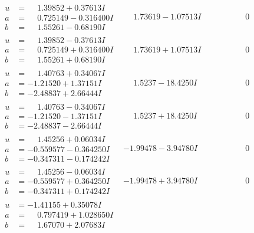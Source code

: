 \documentclass[1p]{elsarticle_modified}
\theoremstyle{definition}
\begin{document}
$$\begin{array}{c|c|c}
\begin{aligned}
u &= \phantom{-}1.39852 + 0.37613 I \\
a &= \phantom{-}0.725149 - 0.316400 I \\
b &= \phantom{-}1.55261 - 0.68190 I\end{aligned}
 & \phantom{-}1.73619 - 1.07513 I & \phantom{-0.000000 } 0 \\ \hline\begin{aligned}
u &= \phantom{-}1.39852 - 0.37613 I \\
a &= \phantom{-}0.725149 + 0.316400 I \\
b &= \phantom{-}1.55261 + 0.68190 I\end{aligned}
 & \phantom{-}1.73619 + 1.07513 I & \phantom{-0.000000 } 0 \\ \hline\begin{aligned}
u &= \phantom{-}1.40763 + 0.34067 I \\
a &= -1.21520 + 1.37151 I \\
b &= -2.48837 + 2.66444 I\end{aligned}
 & \phantom{-}1.5237 - 18.4250 I & \phantom{-0.000000 } 0 \\ \hline\begin{aligned}
u &= \phantom{-}1.40763 - 0.34067 I \\
a &= -1.21520 - 1.37151 I \\
b &= -2.48837 - 2.66444 I\end{aligned}
 & \phantom{-}1.5237 + 18.4250 I & \phantom{-0.000000 } 0 \\ \hline\begin{aligned}
u &= \phantom{-}1.45256 + 0.06034 I \\
a &= -0.559577 - 0.364250 I \\
b &= -0.347311 - 0.174242 I\end{aligned}
 & -1.99478 - 3.94780 I & \phantom{-0.000000 } 0 \\ \hline\begin{aligned}
u &= \phantom{-}1.45256 - 0.06034 I \\
a &= -0.559577 + 0.364250 I \\
b &= -0.347311 + 0.174242 I\end{aligned}
 & -1.99478 + 3.94780 I & \phantom{-0.000000 } 0 \\ \hline\begin{aligned}
u &= -1.41155 + 0.35078 I \\
a &= \phantom{-}0.797419 + 1.028650 I \\
b &= \phantom{-}1.67070 + 2.07683 I\end{aligned}

\end{array}$$
\end{document}

